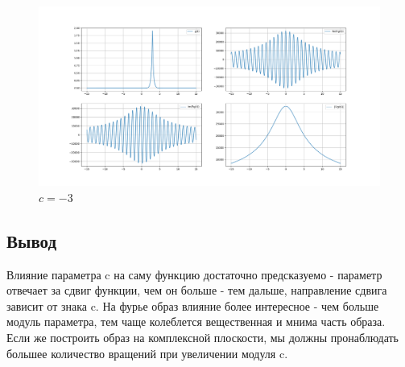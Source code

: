  \begin{figure}
    \centering
      \includegraphics[scale=0.4]{../image/complex_case_img/com_-3.png}
      \caption{$c=-3$}
  \end{figure}
  \clearpage
\newpage
  \subsection{Вывод}
  \noindent Влияние параметра c на саму функцию достаточно предсказуемо - параметр отвечает за сдвиг функции, чем он больше - тем дальше, направление сдвига зависит от знака c. На фурье образ влияние более интересное - чем больше модуль параметра, тем чаще колеблется вещественная и мнима часть образа. Если же построить образ на комплексной плоскости, мы должны пронаблюдать большее количество вращений при увеличении модуля c.
